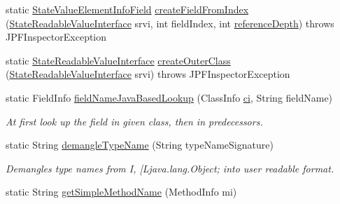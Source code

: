 \begin{DoxyCompactItemize}
\item 
static \hyperlink{classgov_1_1nasa_1_1jpf_1_1inspector_1_1server_1_1programstate_1_1_state_value_element_info_field}{State\+Value\+Element\+Info\+Field} \hyperlink{classgov_1_1nasa_1_1jpf_1_1inspector_1_1server_1_1programstate_1_1_state_value_element_info_field_a9b27b38ad4aad7b01b96c4e755eabef9}{create\+Field\+From\+Index} (\hyperlink{interfacegov_1_1nasa_1_1jpf_1_1inspector_1_1server_1_1programstate_1_1_state_readable_value_interface}{State\+Readable\+Value\+Interface} srvi, int field\+Index, int \hyperlink{classgov_1_1nasa_1_1jpf_1_1inspector_1_1server_1_1programstate_1_1_state_node_a55683618625dae46e8aa68d95811d6bb}{reference\+Depth})  throws J\+P\+F\+Inspector\+Exception 
\item 
static \hyperlink{interfacegov_1_1nasa_1_1jpf_1_1inspector_1_1server_1_1programstate_1_1_state_readable_value_interface}{State\+Readable\+Value\+Interface} \hyperlink{classgov_1_1nasa_1_1jpf_1_1inspector_1_1server_1_1programstate_1_1_state_value_element_info_field_ae252cef96effdf90772114a051b3ca37}{create\+Outer\+Class} (\hyperlink{interfacegov_1_1nasa_1_1jpf_1_1inspector_1_1server_1_1programstate_1_1_state_readable_value_interface}{State\+Readable\+Value\+Interface} srvi)  throws J\+P\+F\+Inspector\+Exception 
\item 
static Field\+Info \hyperlink{classgov_1_1nasa_1_1jpf_1_1inspector_1_1server_1_1programstate_1_1_state_value_element_info_field_a155c1cb68484ce27e2ccebe92c196079}{field\+Name\+Java\+Based\+Lookup} (Class\+Info \hyperlink{classgov_1_1nasa_1_1jpf_1_1inspector_1_1server_1_1programstate_1_1_state_value_a0eb4aa1e630ed6372dcfb8c41ae7edc5}{ci}, String field\+Name)
\begin{DoxyCompactList}\small\item\em At first look up the field in given class, then in predecessors. \end{DoxyCompactList}\item 
static String \hyperlink{classgov_1_1nasa_1_1jpf_1_1inspector_1_1server_1_1programstate_1_1_state_value_a4b2af88402e04430a98ebadbd98a5c67}{demangle\+Type\+Name} (String type\+Name\+Signature)
\begin{DoxyCompactList}\small\item\em Demangles type names from I, \mbox{[}Ljava.\+lang.\+Object; into user readable format. \end{DoxyCompactList}\item 
static String \hyperlink{classgov_1_1nasa_1_1jpf_1_1inspector_1_1server_1_1programstate_1_1_state_value_a7d810b593e21df3baabf5b13e473b152}{get\+Simple\+Method\+Name} (Method\+Info mi)

\end{DoxyCompactItemize}
